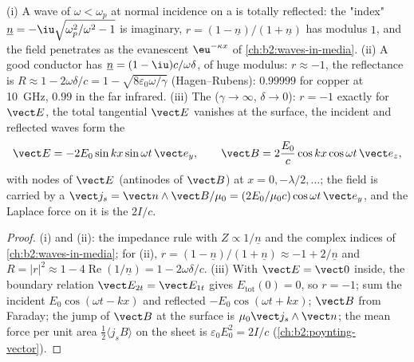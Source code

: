 \begin{proposition}\label{prop:b2:wave-interfaces:conductors}
(i) A wave of $\omega < \omega_p$ at normal incidence on a  is totally
reflected: the "index" $\underline n = -\iu\sqrt{\omega_p^2/\omega^2 - 1}$ is imaginary,
$r = (1 - \underline n)/(1 + \underline n)$ has modulus $1$, and the field penetrates
as the evanescent $\eu^{-\kappa x}$ of \cref{ch:b2:waves-in-media}. (ii) A
good conductor has $\underline n = (1 - \iu)c/\omega\delta$, of huge modulus: $r \approx
-1$, the reflectance is $R \approx 1 - 2\omega\delta/c = 1 - \sqrt{8\varepsilon_0\omega/\gamma}$
(Hagen--Rubens): $0.99999$ for copper at \qty{10}{GHz}, $0.99$ in the far
infrared. (iii) The \emph{} ($\gamma \to \infty$, $\delta \to 0$):
$r = -1$ exactly for $\vect E$, the total tangential $\vect E$ vanishes at
the surface, the incident and reflected waves form the 
\[
\vect E = -2E_0\sin kx\sin\omega t\,\vect e_y , \qquad
\vect B = 2\frac{E_0}c\cos kx\cos\omega t\,\vect e_z ,
\]
with nodes of $\vect E$ (antinodes of $\vect B$) at $x = 0, -\lambda/2, \dots$; the
field is carried by a \emph{} $\vect j_s = \vect n\wedge\vect B/
\mu_0 = (2E_0/\mu_0c)\cos\omega t\,\vect e_y$, and the Laplace force on it is
the  $2I/c$.
\end{proposition}

\begin{proof}
(i) and (ii): the impedance rule with $Z \propto 1/\underline n$ and the complex
indices of \cref{ch:b2:waves-in-media}; for (ii), $r = (1 - \underline n)/(1 +
\underline n) \approx -1 + 2/\underline n$ and $R = |r|^2 \approx 1 - 4\operatorname{Re}(1/
\underline n) = 1 - 2\omega\delta/c$. (iii) With $\vect E = \vect 0$ inside, the
boundary relation $\vect E_{2t} = \vect E_{1t}$ gives $E_{\text{tot}}(0) = 0$, so $r =
-1$; sum the incident $E_0\cos(\omega t - kx)$ and reflected $-E_0\cos(\omega t + kx)$;
$\vect B$ from Faraday; the jump of $\vect B$ at the surface is $\mu_0\vect j_s
\wedge\vect n$; the mean force per unit area $\tfrac12\langle j_sB\rangle$ on
the sheet is $\varepsilon_0E_0^2 = 2I/c$ (\cref{ch:b2:poynting-vector}).
\end{proof}

